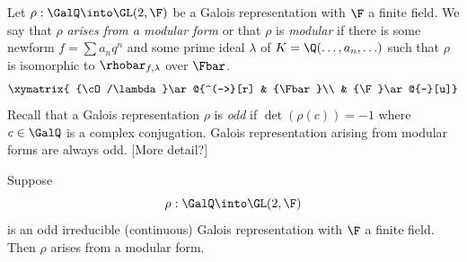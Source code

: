\documentclass{report}
\begin{document}
Let $\rho:\GalQ\into\GL(2,\F)$ be a Galois representation
with $\F$ a finite field.
We say that $\rho$ {\em arises
from a modular form} or that $\rho$ is {\em modular}
if there is some newform $f=\sum a_n q^n$ and
some prime ideal $\lambda$ of $K=\Q(\ldots,a_n,\ldots)$
such that $\rho$ is isomorphic to $\rhobar_{f,\lambda}$
over $\Fbar$.
$$\xymatrix{
{\cO/\lambda}\ar@{^(->}[r] & {\Fbar}\\
            & {\F}\ar@{-}[u]}$$
Recall that a Galois representation $\rho$ is {\em odd} if
$\det(\rho(c))=-1$ where $c\in\GalQ$ is a complex conjugation.
Galois representation arising from modular forms are always odd.
[More detail?]
\begin{conjecture}
Suppose
    $$\rho:\GalQ\into\GL(2,\F)$$
is an odd irreducible (continuous) Galois representation
with $\F$ a finite field.
Then $\rho$ arises from a modular form.
\end{conjecture}
\end{document}
